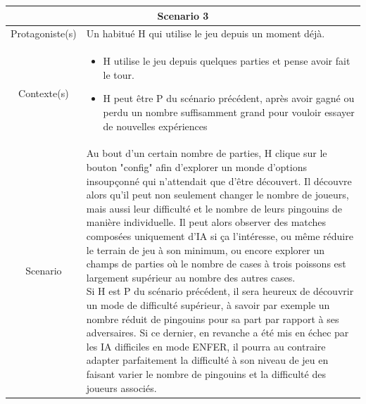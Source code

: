 \documentclass{report}
\begin{document}
\vspace{0.4cm} 
 
 \begin{tabular}{|c|l|}
 \hline
 \multicolumn{2}{|c|}{Scenario 3}\\
 \hline
 Protagoniste(s) & Un habitué H qui utilise le jeu depuis un moment déjà. \\
 \hline
 Contexte(s) & \parbox{13cm} {\begin{itemize}
 	\item H utilise le jeu depuis quelques parties et pense avoir fait le tour.
 	\item H peut être P du scénario précédent, après avoir gagné ou perdu un nombre suffisamment grand pour vouloir essayer de nouvelles expériences
\end{itemize} }\\
 \hline
 Scenario & \parbox{13cm}{  Au bout d'un certain nombre de parties, H clique sur le bouton "config" afin d'explorer un monde d'options insoupçonné qui n'attendait que d'être découvert. Il découvre alors qu'il peut non seulement changer le nombre de joueurs, mais aussi leur difficulté et le nombre de leurs pingouins de manière individuelle. Il peut alors observer des matches composées uniquement d'IA si ça l'intéresse, ou même réduire le terrain de jeu à son minimum, ou encore explorer un champs de parties où le nombre de cases à trois poissons est largement supérieur au nombre des autres cases. \\
 Si H est P du scénario précédent, il sera heureux de découvrir un mode de difficulté supérieur, à savoir par exemple un nombre réduit de pingouins pour sa part par rapport à ses adversaires. Si ce dernier, en revanche a été mis en échec par les IA difficiles en mode ENFER, il pourra au contraire adapter parfaitement la difficulté à son niveau de jeu en faisant varier le nombre de pingouins et la difficulté des joueurs associés. } \\
 \hline
 \end{tabular}

\vspace{0.4cm}
\end{document}

